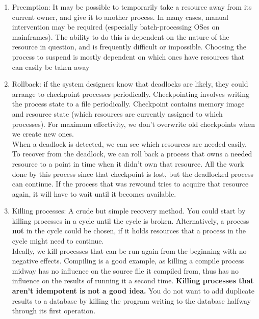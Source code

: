 \documentclass{article}
\begin{document}
\begin{enumerate}
	\item Preemption: It may be possible to temporarily take a resource away from its current owner, and give it to another process. In many cases, manual intervention may be required (especially batch-processing OSes on mainframes). The ability to do this is dependent on the nature of the resource in question, and is frequently difficult or impossible. Choosing the process to suspend is mostly dependent on which ones have resources that can easily be taken away
	\item Rollback: if the system designers know that deadlocks are likely, they could arrange to checkpoint processes periodically. Checkpointing involves writing the process state to a file periodically. Checkpoint contains memory image and resource state (which resources are currently assigned to which processes). For maximum effectivity, we don't overwrite old checkpoints when we create new ones. 
	\\When a deadlock is detected, we can see which resources are needed easily. To recover from the deadlock, we can roll back a process that owns a needed resource to a point in time when it didn't own that resource. All the work done by this process since that checkpoint is lost, but the deadlocked process can continue. If the process that was rewound tries to acquire that resource again, it will have to wait until it becomes available.
	\item Killing processes: A crude but simple recovery method. You could start by killing processes in a cycle until the cycle is broken. Alternatively, a process \textbf{not} in the cycle could be chosen, if it holds resources that a process in the cycle might need to continue. 
	\\Ideally, we kill processes that can be run again from the beginning with no negative effects. Compiling is a good example, as killing a compile process midway has no influence on the source file it compiled from, thus has no influence on the results of running it a second time. \textbf{Killing processes that aren't idempotent is not a good idea.} You do not want to add duplicate results to a database by killing the program writing to the database halfway through its first operation.
\end{enumerate}
\end{document}

